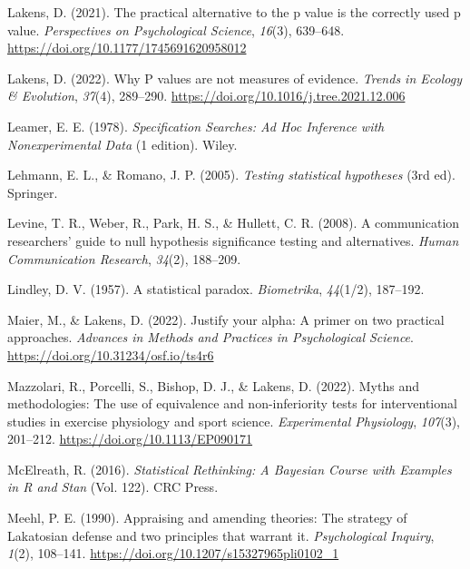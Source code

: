 \documentclass[
  letterpaper,
  DIV=11,
  numbers=noendperiod]{scrreprt}
\newlength{\cslhangindent}
\newlength{\cslentryspacingunit} %
\newenvironment{CSLReferences}[2] %
 {%
  \setlength{\parindent}{0pt}
  \ifodd #1
  \let\oldpar\par
  \def\par{\hangindent=\cslhangindent\oldpar}
  \fi
  \setlength{\parskip}{#2\cslentryspacingunit}
 }%
 {}
\begin{document}
\begin{CSLReferences}{1}{0}
\leavevmode{}%
Lakens, D. (2021). The practical alternative to the p value is the
correctly used p value. \emph{Perspectives on Psychological Science},
\emph{16}(3), 639--648. \url{https://doi.org/10.1177/1745691620958012}

\leavevmode{}%
Lakens, D. (2022). Why {P} values are not measures of evidence.
\emph{Trends in Ecology \& Evolution}, \emph{37}(4), 289--290.
\url{https://doi.org/10.1016/j.tree.2021.12.006}

\leavevmode{}%
Leamer, E. E. (1978). \emph{Specification {Searches}: {Ad Hoc Inference}
with {Nonexperimental Data}} (1 edition). {Wiley}.

\leavevmode{}%
Lehmann, E. L., \& Romano, J. P. (2005). \emph{Testing statistical
hypotheses} (3rd ed). {Springer}.

\leavevmode{}%
Levine, T. R., Weber, R., Park, H. S., \& Hullett, C. R. (2008). A
communication researchers' guide to null hypothesis significance testing
and alternatives. \emph{Human Communication Research}, \emph{34}(2),
188--209.

\leavevmode{}%
Lindley, D. V. (1957). A statistical paradox. \emph{Biometrika},
\emph{44}(1/2), 187--192.

\leavevmode{}%
Maier, M., \& Lakens, D. (2022). Justify your alpha: {A} primer on two
practical approaches. \emph{Advances in Methods and Practices in
Psychological Science}. \url{https://doi.org/10.31234/osf.io/ts4r6}

\leavevmode{}%
Mazzolari, R., Porcelli, S., Bishop, D. J., \& Lakens, D. (2022). Myths
and methodologies: {The} use of equivalence and non-inferiority tests
for interventional studies in exercise physiology and sport science.
\emph{Experimental Physiology}, \emph{107}(3), 201--212.
\url{https://doi.org/10.1113/EP090171}

\leavevmode{}%
McElreath, R. (2016). \emph{Statistical {Rethinking}: {A Bayesian
Course} with {Examples} in {R} and {Stan}} (Vol. 122). {CRC Press}.

\leavevmode{}%
Meehl, P. E. (1990). Appraising and amending theories: {The} strategy of
{Lakatosian} defense and two principles that warrant it.
\emph{Psychological Inquiry}, \emph{1}(2), 108--141.
\url{https://doi.org/10.1207/s15327965pli0102_1}


\end{CSLReferences}
\end{document}
